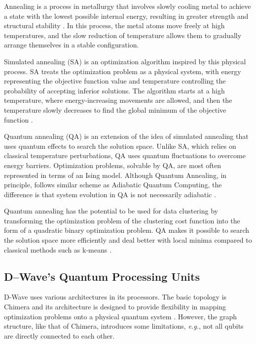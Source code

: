 \documentclass[a4paper,12pt]{article}
\begin{document}
Annealing is a process in metallurgy that involves slowly cooling metal to achieve a state with the lowest possible internal energy, resulting in greater strength and structural stability \cite{Ferrer2001}. In this process, the metal atoms move freely at high temperatures, and the slow reduction of temperature allows them to gradually arrange themselves in a stable configuration.

Simulated annealing (SA) is an optimization algorithm inspired by this physical process. SA treats the optimization problem as a physical system, with energy representing the objective function value and temperature controlling the probability of accepting inferior solutions. The algorithm starts at a high temperature, where energy-increasing movements are allowed, and then the temperature slowly decreases to find the global minimum of the objective function \cite{Benedetti2021}.

Quantum annealing (QA) is an extension of the idea of simulated annealing that uses quantum effects to search the solution space. Unlike SA, which relies on classical temperature perturbations, QA uses quantum fluctuations to overcome energy barriers. Optimization problems, solvable by QA, are most often represented in terms of an Ising model. Although Quantum Annealing, in principle, follows similar scheme as Adiabatic Quantum Computing, the difference is that system evolution in QA is not necessarily adiabatic \cite{Vinci2017}.

Quantum annealing has the potential to be used for data clustering by transforming the optimization problem of the clustering cost function into the form of a quadratic binary optimization problem. QA makes it possible to search the solution space more efficiently and deal better with local minima compared to classical methods such as k-means \cite{Kumar2018}.

\subsection{D–Wave's Quantum Processing Units}\label{dwave_qpu_section}

D-Wave uses various architectures in its processors. The basic topology is Chimera and its architecture is designed to provide flexibility in mapping optimization problems onto a physical quantum system \cite{schuld2021}. However, the graph structure, like that of Chimera, introduces some limitations, \textit{e.g.}, not all qubits are directly connected to each other. 
\end{document}
